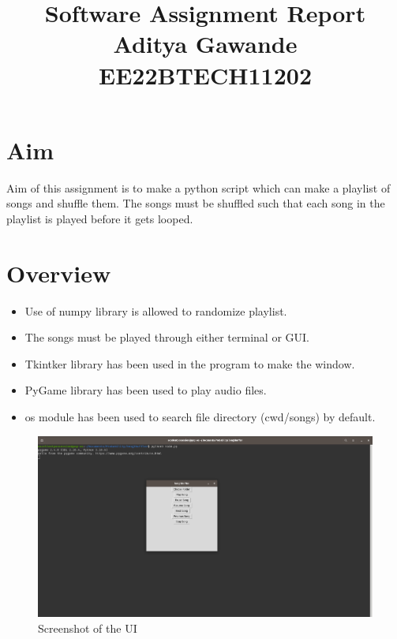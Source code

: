 \documentclass{article}
\begin{document}
\title{Software Assignment Report\\ \large{Aditya Gawande\\EE22BTECH11202}}
\author{}
\date{}
\maketitle

\maketitle

\section*{Aim}
Aim of this assignment is to make a python script which can make a playlist of songs and shuffle them. The songs must be shuffled such that each song in the playlist is played before it gets looped.

\section{Overview}
\begin{itemize}
    \item Use of numpy library is allowed to randomize playlist.
    \item The songs must be played through either terminal or GUI.
    \item Tkintker library has been used in the program to make the window.
    \item PyGame library has been used to play audio files.
    \item os module has been used to search file directory (cwd/songs) by default.
\end{itemize}

\begin{figure}[ht]
	\centering
	\includegraphics[width=0.7\linewidth]{figs/UI.png}
	\caption{Screenshot of the UI}
	\label{fig:view}
\end{figure}
\FloatBarrier
\end{document}
